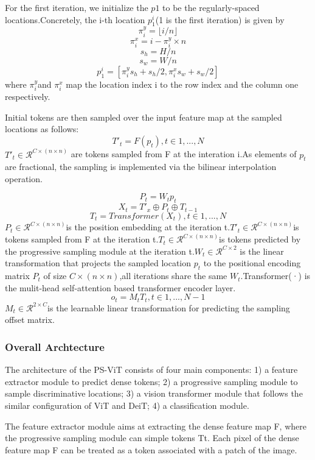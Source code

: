 \documentclass[11pt]{article}
\begin{document}
For the first iteration, we  initialize the $p1$ to be the regularly-spaced locations.Concretely, the i-th location $p^i_1$(1 is the first iteration) is given by
$$\pi_i^y = \lfloor i/n\rfloor$$
$$\pi_i^x = i - \pi_i^y \times n$$
$$s_h = H/n$$
$$s_w = W/n$$
$$p_1^i = [\pi_i^ys_h + s_h/2,\pi_i^xs_w + s_w/2]$$
where $\pi_i^y$and $\pi_i^x$ map the location index i to the row index and the column one respectively.

Initial tokens are then sampled over the input feature map at the sampled locations as follows:
$$T'_t = F(p_t), t\in {1,...,N}$$
$T'_t\in \mathcal{R}^{C\times(n\times n)}$ are tokens sampled from F at the interation i.As elements of $p_t$ are fractional, the sampling is implemented via the bilinear interpolation operation.

$$P_t = W_tp_t$$
$$X_t = T'_x\oplus P_t \oplus T_{t-1}$$
$$T_t = Transformer(X_t), t\in {1,...,N}$$
$P_t\in \mathcal{R}^{C\times (n\times n)}$is the position embedding at the iteration t.$T'_t\in \mathcal{R}^{C\times (n\times n)}$is tokens sampled from F at the iteration t.$T_t\in \mathcal{R}^{C\times (n\times n)}$is tokens predicted by the progressive sampling module at the iteration t.$W_t\in \mathcal{R}^{C\times 2}$ is the linear transformation that projects the sampled location $p_t$ to the positional encoding matrix $P_t$ of size $C\times(n\times n)$,all iterations share the same $W_t$.Transformer(·) is the mulit-head self-attention based transformer encoder layer.
$$o_t = M_tT_t,t\in {1,...,N-1}$$
$M_t\in \mathcal{R}^{2\times C}$is the learnable linear transformation for predicting the sampling offset matrix.
\subsubsection{Overall Archtecture}

The architecture of the PS-ViT consists of four main components: 1) a feature extractor module to predict dense tokens; 2) a progressive sampling module to sample discriminative locations; 3) a vision
transformer module that follows the similar configuration of ViT and DeiT; 4) a classification module.

The feature extractor module aims at extracting the dense feature map F, where the progressive sampling module can simple tokens Tt. Each pixel of the dense feature map F can be treated as a token associated with a patch of the image.
\end{document}

